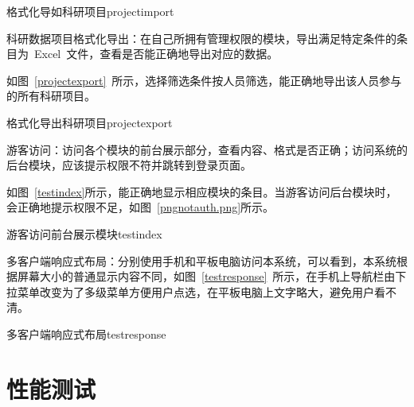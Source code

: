 \begin{pics}[H]{格式化导如科研项目}{projectimport}
\end{pics}

科研数据项目格式化导出：在自己所拥有管理权限的模块，导出满足特定条件的条目为~Excel~文件，查看是否能正确地导出对应的数据。

如图~\ref{projectexport}~所示，选择筛选条件按人员筛选，能正确地导出该人员参与的所有科研项目。

\begin{pics}[H]{格式化导出科研项目}{projectexport}
\end{pics}

游客访问：访问各个模块的前台展示部分，查看内容、格式是否正确；访问系统的后台模块，应该提示权限不符并跳转到登录页面。

如图~\ref{testindex}所示，能正确地显示相应模块的条目。当游客访问后台模块时，会正确地提示权限不足，如图~\ref{pngnotauth.png}所示。

\begin{pics}[H]{游客访问前台展示模块}{testindex}
\end{pics}


多客户端响应式布局：分别使用手机和平板电脑访问本系统，可以看到，本系统根据屏幕大小的普通显示内容不同，如图~\ref{testresponse}~所示，在手机上导航栏由下拉菜单改变为了多级菜单方便用户点选，在平板电脑上文字略大，避免用户看不清。

\begin{pics}[H]{多客户端响应式布局}{testresponse}
\end{pics}
\section{性能测试}

